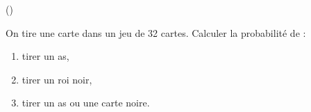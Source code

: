 \begin{exercice}\label{exo3-16} (\minsyndical)

On tire une carte dans un jeu de 32 cartes. Calculer la probabilit\'e de :

\begin{enumerate}
 \item tirer un as,
 \item tirer un roi noir,
 \item tirer un as ou une carte noire.
\end{enumerate}

\end{exercice}
